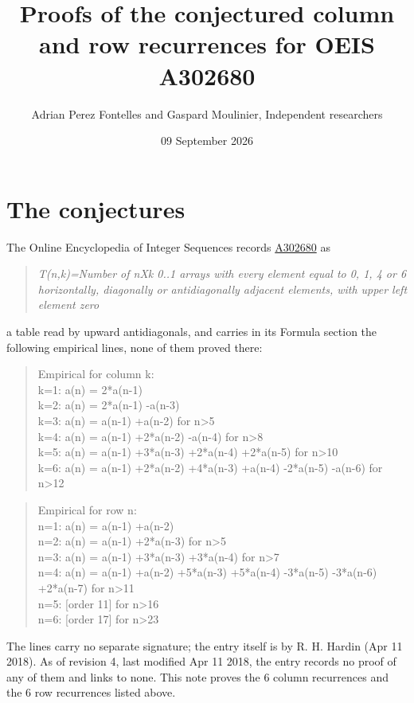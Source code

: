 \documentclass[11pt]{article}
\title{Proofs of the conjectured column and row recurrences for OEIS A302680}
\author{Adrian Perez Fontelles and Gaspard Moulinier, Independent researchers}
\date{09 September 2026}
\theoremstyle{definition}
\begin{document}
\maketitle
\section{The conjectures}

The Online Encyclopedia of Integer Sequences records \href{https://oeis.org/A302680}{A302680} as

\begin{quote}\itshape T(n,k)=Number of nXk 0..1 arrays with every element equal to 0, 1, 4 or 6 horizontally, diagonally or antidiagonally adjacent elements, with upper left element zero\end{quote}

a table read by upward antidiagonals, and carries in its Formula section the following empirical lines, none of them proved there:

\begin{quote}\ttfamily Empirical for column k:\\
k=1: a(n) = 2*a(n-1)\\k=2: a(n) = 2*a(n-1) -a(n-3)\\k=3: a(n) = a(n-1) +a(n-2) for n>5\\k=4: a(n) = a(n-1) +2*a(n-2) -a(n-4) for n>8\\k=5: a(n) = a(n-1) +3*a(n-3) +2*a(n-4) +2*a(n-5) for n>10\\k=6: a(n) = a(n-1) +2*a(n-2) +4*a(n-3) +a(n-4) -2*a(n-5) -a(n-6) for n>12\end{quote}

\begin{quote}\ttfamily Empirical for row n:\\
n=1: a(n) = a(n-1) +a(n-2)\\n=2: a(n) = a(n-1) +2*a(n-3) for n>5\\n=3: a(n) = a(n-1) +3*a(n-3) +3*a(n-4) for n>7\\n=4: a(n) = a(n-1) +a(n-2) +5*a(n-3) +5*a(n-4) -3*a(n-5) -3*a(n-6) +2*a(n-7) for n>11\\n=5: [order 11] for n>16\\n=6: [order 17] for n>23\end{quote}

The lines carry no separate signature; the entry itself is by R. H. Hardin (Apr 11 2018). As of revision 4, last modified Apr 11 2018, the entry records no proof of any of them and links to none. This note proves the 6 column recurrences and the 6 row recurrences listed above.
\end{document}

